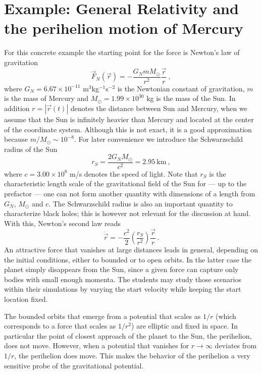 \documentclass[12pt,ngerman,american]{iopart}
\begin{document}
\section{Example: General Relativity and the perihelion motion of Mercury}\label{sec:gr}
For this concrete example the starting point for the force is Newton's law of gravitation
\begin{equation}
\vec F_N(\vec r) = - \frac{G_N m M_\odot}{r^2} \frac{\vec r}{r}\ ,\label{eq:newton_grav}
\end{equation}
where $G_N=6.67\times 10^{-11}$ m$^3$kg$^{-1}$s$^{-2}$ is the Newtonian constant of gravitation, $m$ is the mass of Mercury and $M_\odot=1.99\times 10^{30}$ kg is the mass of the Sun.
In addition $r=|\vec r(t)|$ denotes the distance between Sun and Mercury, when we assume that the Sun is infinitely heavier than Mercury and located at the center of the coordinate system.
Although this is not exact, it is a good approximation because $m/M_\odot\sim 10^{-8}$.
For later convenience we introduce the Schwarzschild radius of the Sun
\begin{equation}
r_S=\frac{2G_N  M_\odot}{c^2} = 2.95 \ \mbox{km} \ , \label{rsdef}
\end{equation}
where $c=3.00\times 10^8$ m/s denotes the speed of light.
Note that $r_S$ is the characteristic length scale of the gravitational field of the Sun for --- up to the prefactor --- one can not form another quantity with dimensions of a length from $G_N$, $M_\odot$ and $c$.
The Schwarzschild radius is also an important quantity to characterize black holes; this is however not relevant for the discussion at hand.
With this, Newton's second law reads
\begin{equation}
\ddot{\vec r}      = - \frac{c^2}{2}\left(\frac{r_S}{r^2}\right)\frac{\vec r}{r} \, . \label{eq:newton}
\end{equation}
An attractive force that vanishes at large distances leads in general, depending on the initial conditions, either to bounded or to open orbits.
In the latter case the planet simply disappears from the Sun, since a given force can capture only bodies with small enough momenta.
The students may study those scenarios within their simulations by varying the start velocity while keeping the start location fixed.

The bounded orbits that emerge from a potential that scales as $1/r$ (which corresponds to a force that scales as $1/r^2$) are elliptic and fixed in space.
In particular the point of closest approach of the planet to the Sun, the perihelion, does not move.
However, when a potential that vanishes for $r\to \infty$ deviates from $1/r$, the perihelion does move.
This makes the behavior of the perihelion a very sensitive probe of the gravitational potential.
\end{document}
